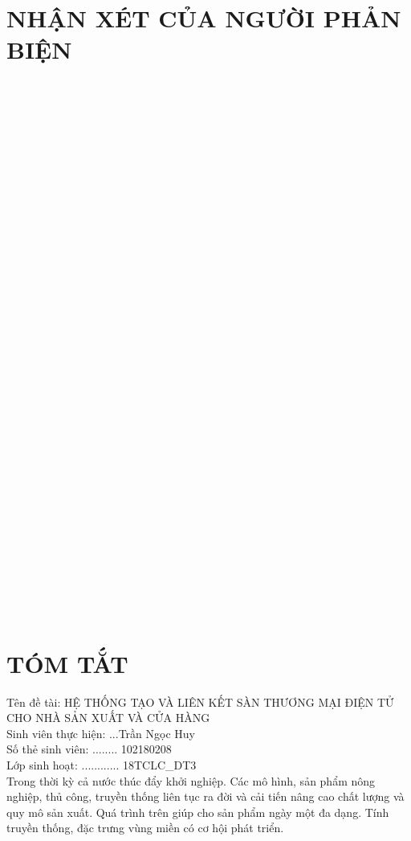 \documentclass[11pt]{report}
\newcommand{\project}{HỆ THỐNG TẠO VÀ LIÊN KẾT SÀN THƯƠNG MẠI ĐIỆN TỬ CHO NHÀ SẢN XUẤT VÀ CỬA HÀNG}
\newcommand{\me}{Trần Ngọc Huy}
\newcommand{\msv}{102180208}
\newcommand{\myclass}{18TCLC\_DT3}
\begin{document}
	\chapter*{NHẬN XÉT CỦA NGƯỜI PHẢN BIỆN}
	\dotfill\\\dotfill\\\dotfill\\\dotfill\\\dotfill
	\\\dotfill\\\dotfill\\\dotfill\\\dotfill\\\dotfill
	\\\dotfill\\\dotfill\\\dotfill\\\dotfill\\\dotfill
	\\\dotfill\\\dotfill\\\dotfill\\\dotfill\\\dotfill
	\\\dotfill\\\dotfill\\\dotfill\\\dotfill\\\dotfill
	\\\dotfill\\\dotfill\\\dotfill\\\dotfill\\\dotfill
	\\\dotfill\\\dotfill\\\dotfill\\\dotfill\\
	\pagebreak
	
	
	
	\chapter*{TÓM TẮT}
	\raggedright
	\makeatletter
	
	Tên đề tài: \project\\
	Sinh viên thực hiện: ...\me \dotfill\\
	Số thẻ sinh viên: ........ \msv \dotfill\\
	Lớp sinh hoạt: ............ \myclass \dotfill\\
	\vspace{14px}
	\justifying
	\fontsize{13px}{13px}\selectfont
	Trong thời kỳ cả nước thúc đẩy khởi nghiệp. Các mô hình, sản phẩm nông nghiệp, thủ công, truyền thống liên tục ra đời và cải tiến nâng cao chất lượng và quy mô sản xuất. Quá trình trên giúp cho sản phẩm ngày một đa dạng. Tính truyền thống, đặc trưng vùng miền có cơ hội phát triển.
	
\end{document}
